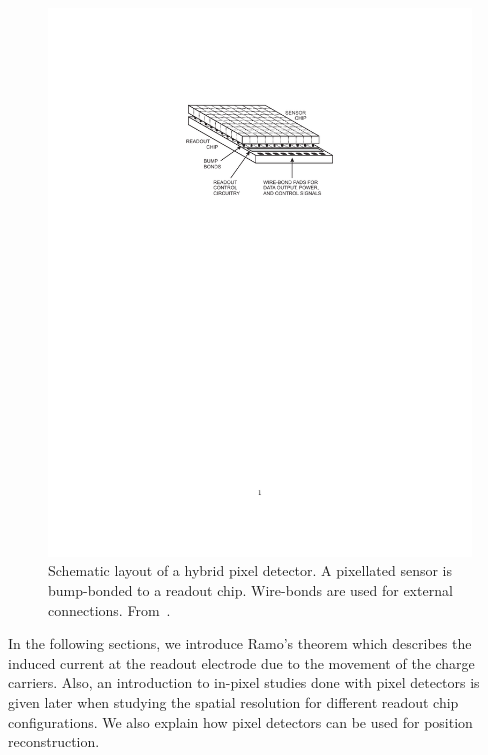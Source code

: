 \begin{figure}[htbp]
  \centering
  \includegraphics[width=\textwidth, trim = 30mm 180mm 30mm 45mm,
  clip]{figures/ChargeSharing/PixelCell.pdf}
  \caption{Schematic layout of a hybrid pixel detector. A pixellated
    sensor is bump-bonded to a readout chip. Wire-bonds are used for
    external connections.
    From~\cite{Spieler2005}.}%
  \label{fig:pixelCell}
\end{figure}

In the following sections, we introduce Ramo's theorem which describes
the induced current at the readout electrode due to the movement of
the charge carriers. Also, an introduction to in-pixel studies done
with pixel detectors is given later when studying the spatial
resolution for different readout chip configurations. We also explain
how pixel detectors can be used for position reconstruction.


